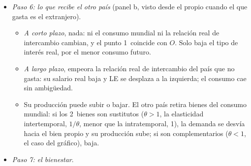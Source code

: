 \documentclass[11pt]{article}
\begin{document}
\begin{itemize}
\begin{itemize}
    Es un multiplicador igual a 1, como el del presupuesto equilibrado (anexo~\ref{anexo:islm}): la mayor demanda pública se atiende con más producción propia, sin expulsar exportaciones netas. El punto 1~queda por encima de LE: se trabaja más de lo que se querría a esos precios.
  \item \emph{El tipo de interés real mundial baja}: los hogares saben que el consumo futuro será menor, y por la ecuación de , con el consumo de hoy dado, $1+r=(1/\beta)(C/\overline{C})^{-\theta}<1/\beta$. Al revés que en el IS-LM, donde el gasto sube el tipo.
  \item \emph{A largo plazo} (de 1~a 2): los salarios del país suben por la mayor demanda permanente de su bien, que se encarece: la relación real de intercambio \emph{mejora} y la moneda se aprecia en términos reales. La apreciación compensa en parte la mayor demanda (GE de largo plazo, entre la inicial y la de corto plazo) y el salario real más alto desplaza LE a la derecha.
  \item En el nuevo estado estacionario, 2, la producción es mayor y el consumo menor que en $O$: la producción sube \emph{menos} que el gasto, $Y-G$ baja y cae la oferta mundial de bienes de consumo. Como $C/C^*$ no cambia, el consumo de los 2~países cae en la misma proporción.
  \end{itemize}
\item \emph{Paso 6: lo que recibe el otro país} (panel b, visto desde el propio cuando el que gasta es el extranjero).
  \begin{itemize}
  \item \emph{A corto plazo}, nada: ni el consumo mundial ni la relación real de intercambio cambian, y el punto 1~coincide con $O$. Solo baja el tipo de interés real, por el menor consumo futuro.
  \item \emph{A largo plazo}, empeora la relación real de intercambio del país que no gasta: su salario real baja y LE se desplaza a la izquierda; el consumo cae sin ambigüedad.
  \item Su producción puede subir o bajar. El otro país retira bienes del consumo mundial: si los 2~bienes son sustitutos ($\theta>1$, la elasticidad intertemporal, $1/\theta$, menor que la intratemporal, 1), la demanda se desvía hacia el bien propio y su producción sube; si son complementarios ($\theta<1$, el caso del gráfico), baja.
  \end{itemize}
\item \emph{Paso 7: el bienestar}.
  \begin{itemize}

\end{itemize}
\end{itemize}
\end{document}
